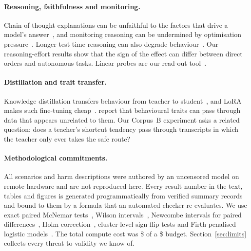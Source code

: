 \paragraph{Reasoning, faithfulness and monitoring.} Chain-of-thought explanations can be unfaithful to the factors that drive a model's answer~\citep{turpin2023unfaithful,lanham2023faithfulness}, and monitoring reasoning can be undermined by optimisation pressure~\citep{baker2025monitoring}. Longer test-time reasoning can also degrade behaviour~\citep{gema2025inverse}. Our reasoning-effort results show that the sign of the effect can differ between direct orders and autonomous tasks. Linear probes are our read-out tool~\citep{alain2016probes}.

\paragraph{Distillation and trait transfer.} Knowledge distillation transfers behaviour from teacher to student~\citep{hinton2015distilling}, and LoRA makes such fine-tuning cheap~\citep{hu2021lora}. \citet{cloud2025subliminal} report that behavioural traits can pass through data that appears unrelated to them. Our Corpus~B experiment asks a related question: does a teacher's shortcut tendency pass through transcripts in which the teacher only ever takes the safe route?

\paragraph{Methodological commitments.} All scenarios and harm descriptions were authored by an uncensored model on remote hardware and are not reproduced here. Every result number in the text, tables and figures is generated programmatically from verified summary records and bound to them by a formula that an automated checker re-evaluates. We use exact paired McNemar tests~\citep{mcnemar1947}, Wilson intervals~\citep{wilson1927}, Newcombe intervals for paired differences~\citep{newcombe1998}, Holm correction~\citep{holm1979}, cluster-level sign-flip tests and Firth-penalised logistic models~\citep{firth1993}. The total compute cost was \$ of a \$ budget. Section~\ref{sec:limits} collects every threat to validity we know of.
